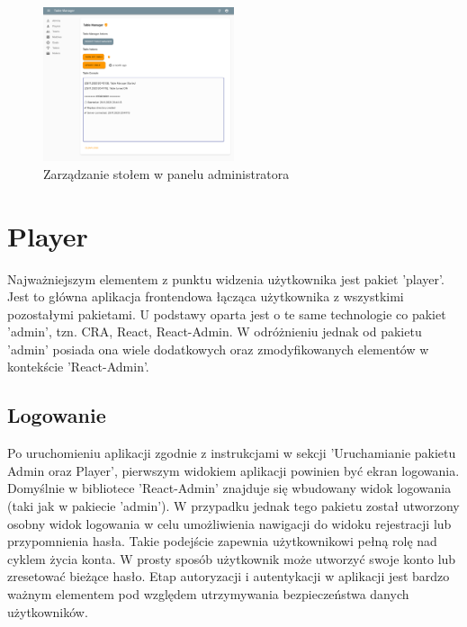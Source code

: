 \begin{figure}[h!]
  \centering
    \includegraphics[width=0.5\textwidth]{images/admin/table-manager.png}
  \caption{Zarządzanie stołem w panelu administratora}
  \label{fig:mobile}
\end{figure}

\section{Player}

Najważniejszym elementem z punktu widzenia użytkownika jest pakiet 'player'. Jest to główna aplikacja frontendowa łącząca użytkownika z wszystkimi pozostałymi pakietami. U podstawy oparta jest o te same technologie co pakiet 'admin', tzn. CRA, React, React-Admin. W odróżnieniu jednak od pakietu 'admin' posiada ona wiele dodatkowych oraz zmodyfikowanych elementów w kontekście 'React-Admin'.

\subsection{Logowanie}

Po uruchomieniu aplikacji zgodnie z instrukcjami w sekcji 'Uruchamianie pakietu Admin oraz Player', pierwszym widokiem aplikacji powinien być ekran logowania. Domyślnie w bibliotece 'React-Admin' znajduje się wbudowany widok logowania (taki jak w pakiecie 'admin'). W przypadku jednak tego pakietu został utworzony osobny widok logowania w celu umożliwienia nawigacji do widoku rejestracji lub przypomnienia hasła. Takie podejście zapewnia użytkownikowi pełną rolę nad cyklem życia konta. W prosty sposób użytkownik może utworzyć swoje konto lub zresetować bieżące hasło. Etap autoryzacji i autentykacji w aplikacji jest bardzo ważnym elementem pod względem utrzymywania bezpieczeństwa danych użytkowników.

